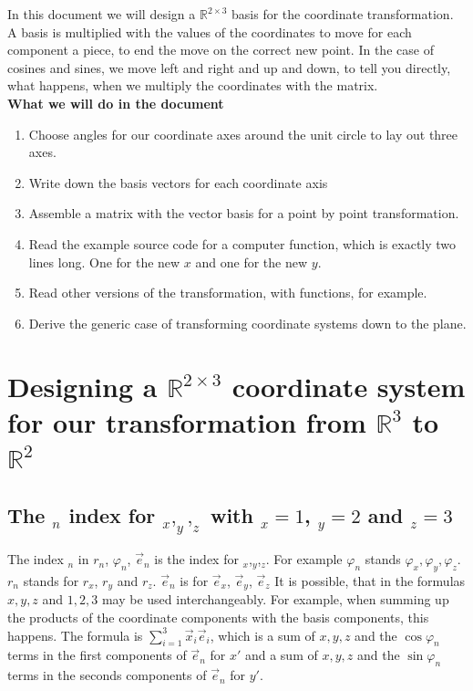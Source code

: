 \documentclass[a4paper]{article}
\begin{document}
In this document we will design a $\mathbb{R}^{2\times{3}}$ basis for the coordinate transformation. 
A basis is multiplied with the values of the coordinates to move for each component 
a piece, to end the move on the correct new point.
In the case of cosines and sines, we move left and right and up and down, to 
tell you directly, what happens, when we multiply the coordinates with the matrix.\\

\textbf{What we will do in the document}

\begin{enumerate}
\item Choose angles for our coordinate axes around the unit circle to lay out three axes.
\item Write down the basis vectors for each coordinate axis
\item Assemble a matrix with the vector basis for a point by point transformation.
\item Read the example source code for a computer function, which is exactly two lines long. One for the new $x$ and one for the new $y$.
\item Read other versions of the transformation, with functions, for example.
\item Derive the generic case of transforming coordinate systems down to the plane.
\end{enumerate}

\section{Designing a $\mathbb{R}^{2\times{3}}$ coordinate system for our transformation from $\mathbb{R}^{3}$ to $\mathbb{R}^{2}$}

\subsection{The $_{n}$ index for $_x,_y,_z$ with $_x=1$, $_y=2$ and $_z=3$}

The index $_{n}$ in $r_{n}$, $\varphi_{n}$, $\vec{e}_{n}$ is the index for $_x$,$_y$,$_z$. For example $\varphi_{n}$  stands $\varphi_x, \varphi_y, \varphi_z$. $r_{n}$ stands for $r_x$, $r_y$ and $r_z$. $\vec{e}_{n}$ is for $\vec{e}_x$, $\vec{e}_y$, $\vec{e}_z$ It is possible, that in the formulas $x,y,z$ and $1,2,3$ may be used interchangeably. For example, when summing up the products of the coordinate components with the basis components, this happens. The formula is $\sum_{i=1}^{3}\vec{x}_{i}\vec{e}_{i}$, which is a sum of $x,y,z$ and the $\cos \varphi_{n}$ terms in the first components of $\vec{e}_{n}$ for $x'$ and a sum of $x,y,z$ and the $\sin \varphi_{n}$ terms in the seconds components of $\vec{e}_{n}$ for $y'$.
\end{document}
